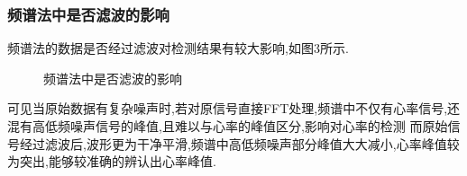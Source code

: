 \documentclass[12pt, a4paper, oneside]{ctexart}
\begin{document}
      \subsubsection{频谱法中是否滤波的影响}
    频谱法的数据是否经过滤波对检测结果有较大影响,如图3所示.
      \begin{figure}[H]
        \centering
        \caption{频谱法中是否滤波的影响}
        \label{fig:twopicture} 
      \end{figure}
      
      可见当原始数据有复杂噪声时,若对原信号直接FFT处理,频谱中不仅有心率信号,还混有高低频噪声信号的峰值,且难以与心率的峰值区分,影响对心率的检测
      而原始信号经过滤波后,波形更为干净平滑,频谱中高低频噪声部分峰值大大减小,心率峰值较为突出,能够较准确的辨认出心率峰值.
\end{document}
